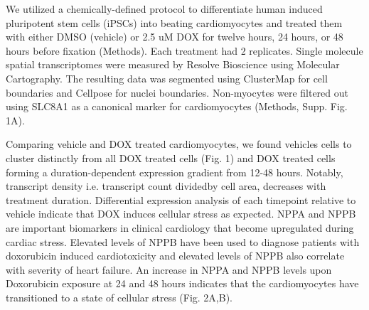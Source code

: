 We utilized a chemically-defined protocol to differentiate human induced pluripotent stem cells (iPSCs) into beating cardiomyocytes and treated them with either DMSO (vehicle) or 2.5 uM DOX for twelve hours, 24 hours, or 48 hours before fixation (Methods). Each treatment had 2 replicates. Single molecule spatial transcriptomes were measured by Resolve Bioscience using Molecular Cartography. The resulting data was segmented using ClusterMap\cite{heClusterMapMultiscaleClustering2021} for cell boundaries and Cellpose\cite{stringerCellposeGeneralistAlgorithm2021} for nuclei boundaries. Non-myocytes were filtered out using SLC8A1 as a canonical marker for cardiomyocytes (Methods, Supp. Fig. 1A). 


Comparing vehicle and DOX treated cardiomyocytes, we found vehicles cells to cluster distinctly from all DOX treated cells (Fig. 1) and DOX treated cells forming a duration-dependent expression gradient from 12-48 hours. Notably, transcript density i.e. transcript count dividedby cell area, decreases with treatment duration. Differential expression analysis of each timepoint relative to vehicle indicate that DOX induces cellular stress as expected. NPPA and NPPB are important biomarkers in clinical cardiology that become upregulated during cardiac stress\cite{manStructureFunctionNppa2018,songAtrialNatriureticPeptide2015}. Elevated levels of NPPB have been used to diagnose patients with doxorubicin induced cardiotoxicity and elevated levels of NPPB also correlate with severity of heart failure. An increase in NPPA and NPPB levels upon Doxorubicin exposure at 24 and 48 hours indicates that the cardiomyocytes have transitioned to a state of cellular stress (Fig. 2A,B).

